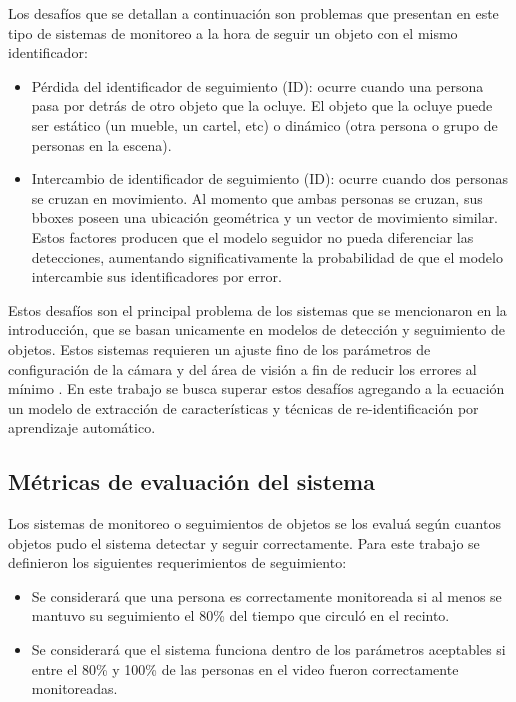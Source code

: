 \documentclass[conference]{IEEEtran}
\begin{document}
Los desafíos que se detallan a continuación son problemas que presentan en este tipo de sistemas de monitoreo a la hora de seguir un objeto con el mismo identificador:
\begin{itemize}
\item Pérdida del identificador de seguimiento (ID): ocurre cuando una persona pasa por detrás de otro objeto que la ocluye. El objeto que la ocluye puede ser estático (un mueble, un cartel, etc) o dinámico (otra persona o grupo de personas en la escena).
\item Intercambio de identificador de seguimiento (ID): ocurre cuando dos personas se cruzan en movimiento. Al momento que ambas personas se cruzan, sus bboxes poseen una ubicación geométrica y un vector de movimiento similar. Estos factores producen que el modelo seguidor no pueda diferenciar las detecciones, aumentando significativamente la probabilidad de que el modelo intercambie sus identificadores por error.
\end{itemize}

Estos desafíos son el principal problema de los sistemas que se mencionaron en la introducción, que se basan unicamente en modelos de detección y seguimiento de objetos. Estos sistemas requieren un ajuste fino de los parámetros de configuración de la cámara y del área de visión a fin de reducir los errores al mínimo \cite{b14}. En este trabajo se busca superar estos desafíos agregando a la ecuación un modelo de extracción de características y técnicas de re-identificación por aprendizaje automático.

\subsection{Métricas de evaluación del sistema}

Los sistemas de monitoreo o seguimientos de objetos se los evaluá según cuantos objetos pudo el sistema detectar y seguir correctamente. Para este trabajo se definieron los siguientes requerimientos de seguimiento:

\begin{itemize}
\item Se considerará que una persona es correctamente monitoreada si al menos se mantuvo su seguimiento el 80\% del tiempo que circuló en el
recinto.
\item Se considerará que el sistema funciona dentro de los parámetros aceptables si entre el 80\% y 100\% de las personas en el video fueron correctamente monitoreadas.
\end{itemize}
\end{document}

